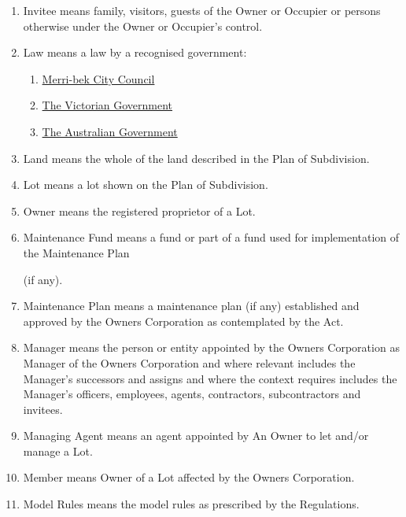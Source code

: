 \documentclass{article}
\begin{document}
\begin{enumerate}[label=\arabic*.]
\begin{enumerate}[label=\arabic{enumi}.\arabic*.]
\begin{enumerate}[label=(\arabic*)]
\item  Invitee means family, visitors, guests of the Owner or Occupier or persons otherwise under the Owner or Occupier’s control.

\item Law means a law by a recognised government:
\begin{enumerate}
    \item \href{https://www.merri-bek.vic.gov.au/}{Merri-bek City Council}
    \item \href{https://www.vic.gov.au/}{The Victorian Government}
    \item \href{https://my.gov.au/}{The Australian Government}
\end{enumerate}

\item  Land means the whole of the land described in the Plan of Subdivision.

\item  Lot means a lot shown on the Plan of Subdivision.

\item  Owner means the registered proprietor of a Lot.

\item  Maintenance Fund means a fund or part of a fund used for implementation of the Maintenance Plan

(if any).

\item  Maintenance Plan means a maintenance plan (if any) established and approved by the Owners Corporation as contemplated by the Act.

\item  Manager means the person or entity appointed by the Owners Corporation as Manager of the Owners Corporation and where relevant includes the Manager’s successors and assigns and where the context requires includes the Manager’s officers, employees, agents, contractors, subcontractors and invitees.

\item  Managing Agent means an agent appointed by An Owner to let and/or manage a Lot.
\newpage



\item  Member means Owner of a Lot affected by the Owners Corporation.

\item  Model Rules means the model rules as prescribed by the Regulations.


\end{enumerate}
\end{enumerate}
\end{enumerate}
\end{document}

